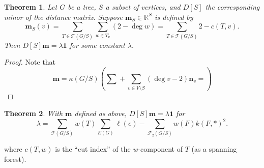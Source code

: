 \documentclass{amsart}
\newtheorem{thm}{Theorem}
\theoremstyle{definition}
\newcommand{\RR}{\mathbb{R}}
\newcommand{\trees}{\mathcal{T}}
\newcommand{\forests}{\mathcal{F}}
\begin{document}
\begin{thm}
Let $G$ be a tree, $S$ a subset of vertices,
and $D[S]$ the corresponding minor of the distance matrix.
Suppose $\mathbf{m}_S \in \RR^{S}$ is defined by
\begin{equation*}
\mathbf{m}_S(v) = \sum_{T \in \mathcal T(G/S)} \sum_{w \in T_v} (2 - \deg w) 
= \sum_{T \in \trees(G/S)} 2 - c(T,v) .
\end{equation*}
Then
$D[S] \mathbf{m} = \lambda \mathbf{1}$
for some constant $\lambda$.
\end{thm}
\begin{proof}
Note that
$$
\mathbf{m}
= \kappa(G/S) \left( \sum_{} + 
\sum_{v \in V \setminus S} ( \deg v - 2) \mathbf{n}_v 
= \right)
$$
\end{proof}

\begin{thm}
With $\mathbf{m}$ defined as above,
$D[S] \mathbf{m} = \lambda \mathbf{1}$
for 
\begin{equation}
\lambda = \sum_{\trees(G/S)} w(T) \sum_{E(G)} \ell(e) - \sum_{\forests_2(G/S)} w(F) k(F,*)^2 .
\end{equation}
\end{thm}
where $c(T,w)$ is the ``cut index'' of the $w$-component of $T$ (as a spanning forest).
\end{document}
